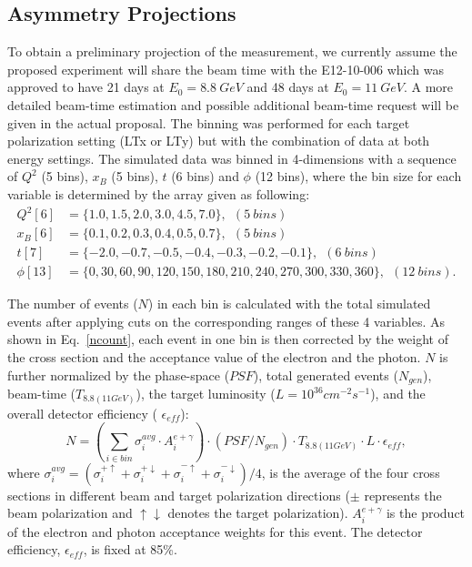 \subsection{Asymmetry Projections}
To obtain a preliminary projection of the measurement, we currently assume the proposed experiment will share the beam time with the E12-10-006 which was approved to have 21 days at $E_{0}=8.8~GeV$ and 48 days at $E_{0}=11~GeV$. A more detailed beam-time estimation and possible additional beam-time request will be given in the actual proposal. The binning was performed for each target polarization setting (LTx or LTy) but with the combination of data at both energy settings. The simulated data was binned in 4-dimensions with a sequence of $Q^{2}$ (5 bins), $x_{B}$ (5 bins), $t$ (6 bins) and $\phi$ (12 bins), where the bin size for each variable is determined by the array given as following:
\begin{align}
 \label{bin_array1}
 Q^{2}[6] &= \{1.0,1.5,2.0,3.0,4.5,7.0\}, ~~(5~bins)\\
 x_{B}[6] &= \{0.1,0.2,0.3,0.4,0.5,0.7\}, ~~(5~bins)\\
 t[7] &=\{-2.0,-0.7,-0.5,-0.4,-0.3,-0.2,-0.1\}, ~~(6~bins)\\
 \phi[13] &=\{0,30,60,90,120,150,180,210,240,270,300,330,360\}, ~~(12~bins).
\label{bin_array4}
\end{align}

The number of events ($N$) in each bin is calculated with the total simulated events after applying cuts on the corresponding ranges of these 4 variables. As shown in Eq.~\ref{ncount}, each event in one bin is then corrected by the weight of the cross section and the acceptance value of the electron and the photon. $N$ is further normalized by the phase-space ($PSF$), total generated events ($N_{gen}$), beam-time ($T_{8.8(11GeV)}$), the target luminosity ($L=10^{36} cm^{-2}s^{-1}$), and the overall detector efficiency ( $\epsilon_{eff}$):
 \begin{equation}
     N = (\sum_{i\in bin} \sigma^{avg}_{i}\cdot A^{e+\gamma}_{i}) \cdot (PSF/N_{gen}) \cdot T_{8.8(11GeV)} \cdot L \cdot \epsilon_{eff},
     \label{ncount}
 \end{equation}
 where $\sigma^{avg}_{i}=(\sigma^{+\uparrow}_{i}+\sigma^{+\downarrow}_{i}+\sigma^{-\uparrow}_{i}+\sigma^{-\downarrow}_{i})/4$, is the average of the four cross sections in different beam and target polarization directions ($\pm$ represents the beam polarization and $\uparrow\downarrow$ denotes the target polarization). $A^{e+\gamma}_{i}$ is the product of the electron and photon acceptance weights for this event. The detector efficiency, $\epsilon_{eff}$, is fixed at 85\%. 


